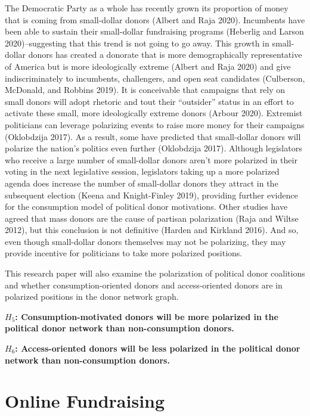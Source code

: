 \documentclass[12pt,]{article}
\begin{document}
The Democratic Party as a whole has recently grown its proportion of
money that is coming from small-dollar donors (Albert and Raja 2020).
Incumbents have been able to sustain their small-dollar fundraising
programs (Heberlig and Larson 2020)--suggesting that this trend is not
going to go away. This growth in small-dollar donors has created a
donorate that is more demographically representative of America but is
more ideologically extreme (Albert and Raja 2020) and give
indiscriminately to incumbents, challengers, and open seat candidates
(Culberson, McDonald, and Robbins 2019). It is conceivable that
campaigns that rely on small donors will adopt rhetoric and tout their
``outsider'' status in an effort to activate these small, more
ideologically extreme donors (Arbour 2020). Extremist politicians can
leverage polarizing events to raise more money for their campaigns
(Oklobdzija 2017). As a result, some have predicted that small-dollar
donors will polarize the nation's politics even further (Oklobdzija
2017). Although legislators who receive a large number of small-dollar
donors aren't more polarized in their voting in the next legislative
session, legislators taking up a more polarized agenda does increase the
number of small-dollar donors they attract in the subsequent election
(Keena and Knight-Finley 2019), providing further evidence for the
consumption model of political donor motivations. Other studies have
agreed that mass donors are the cause of partisan polarization (Raja and
Wiltse 2012), but this conclusion is not definitive (Harden and Kirkland
2016). And so, even though small-dollar donors themselves may not be
polarizing, they may provide incentive for politicians to take more
polarized positions.

This research paper will also examine the polarization of political
donor coalitions and whether consumption-oriented donors and
access-oriented donors are in polarized positions in the donor network
graph.

\textbf{\(H_{5}\): Consumption-motivated donors will be more polarized
in the political donor network than non-consumption donors.}

\textbf{\(H_{6}\): Access-oriented donors will be less polarized in the
political donor network than non-consumption donors.}

\hypertarget{online-fundraising}{%
\section{Online Fundraising}\label{online-fundraising}}
\end{document}
